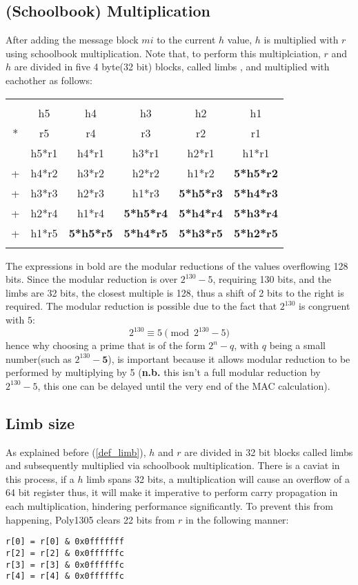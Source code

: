 \documentclass[twocolumn]{article}
\begin{document}
\subsection{(Schoolbook) Multiplication}
After adding the message block $mi$ to the current $h$ value, $h$ is multiplied with $r$ using schoolbook multiplication. Note that, to perform this multiplciation, 
$r$ and $h$ are divided in five 4 byte(32 bit) blocks, called limbs \label{def_limb}, and multiplied with eachother as follows:
\begin{footnotesize}
\begin{tabular}{cccccc}
    &    &    &    &    &    \\
    & h5 & h4 & h3 & h2 & h1 \\
*   & r5 & r4 & r3 & r2 & r1 \\
\hline
    & h5*r1 & h4*r1 & h3*r1 & h2*r1 & h1*r1 \\
+   & h4*r2 & h3*r2 & h2*r2 & h1*r2 & \textbf{5*h5*r2} \\
+   & h3*r3 & h2*r3 & h1*r3 & \textbf{5*h5*r3} & \textbf{5*h4*r3} \\
+   & h2*r4 & h1*r4 & \textbf{5*h5*r4} & \textbf{5*h4*r4} & \textbf{5*h3*r4} \\
+   & h1*r5 & \textbf{5*h5*r5} & \textbf{5*h4*r5} & \textbf{5*h3*r5} & \textbf{5*h2*r5}\\
    &    &    &    &    &    \\
\end{tabular}
\end{footnotesize}
The expressions in bold are the modular reductions of the values overflowing 128 bits. Since the modular reduction is over $2^{130}-5$, requiring 130 bits, and the limbs
are 32 bits, the closest multiple is 128, thus a shift of 2 bits to the right is required. The modular reduction is possible due to the fact that $2^{130}$ is congruent
with $5$:
$$2^{130} \equiv 5 \pmod{2^{130}-5}$$ 
hence why choosing a prime that is of the form $2^n-q$, with $q$ being a small number(such as $2^{130}-\textbf{5}$), is important because it allows modular reduction to be 
performed by multiplying by 5 (\textbf{n.b.} this isn't a full modular reduction by $2^{130}-5$, this one can be delayed until the very end of the MAC calculation).

\subsection{Limb size}
As explained before (\ref{def_limb}), $h$ and $r$ are divided in 32 bit blocks called limbs and subsequently multiplied via schoolbook multiplication. There is a caviat
in this process, if a $h$ limb spans 32 bits, a multiplication will cause an overflow of a 64 bit register thus, it will make it imperative to perform carry propagation
in each multiplication, hindering performance significantly. To prevent this from happening, Poly1305 clears 22 bits from $r$ in the following manner:
\begin{verbatim}
r[0] = r[0] & 0x0fffffff
r[2] = r[2] & 0x0ffffffc
r[3] = r[3] & 0x0ffffffc
r[4] = r[4] & 0x0ffffffc
\end{verbatim}
\end{document}
